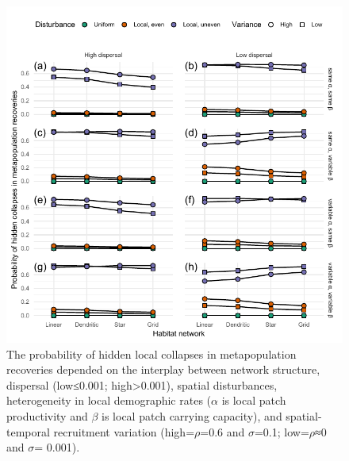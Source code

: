 \documentclass[
]{article}
\begin{document}
\begin{figure}[H]

{\centering \includegraphics{Managing_for_ecological_surprises_in_metapopulations_files/figure-latex/conditional probability for hidden collapses-1} 

}

\caption{The probability of hidden local collapses in metapopulation recoveries depended on the interplay between network structure, dispersal (low≤0.001; high>0.001), spatial disturbances, heterogeneity in local demographic rates ($\alpha$ is local patch productivity and $\beta$ is local patch carrying capacity), and spatial-temporal recruitment variation (high=$\rho$=0.6 and $\sigma$=0.1; low=$\rho$≈0 and $\sigma$= 0.001).}\label{fig:conditional probability for hidden collapses}
\end{figure}
\end{document}
